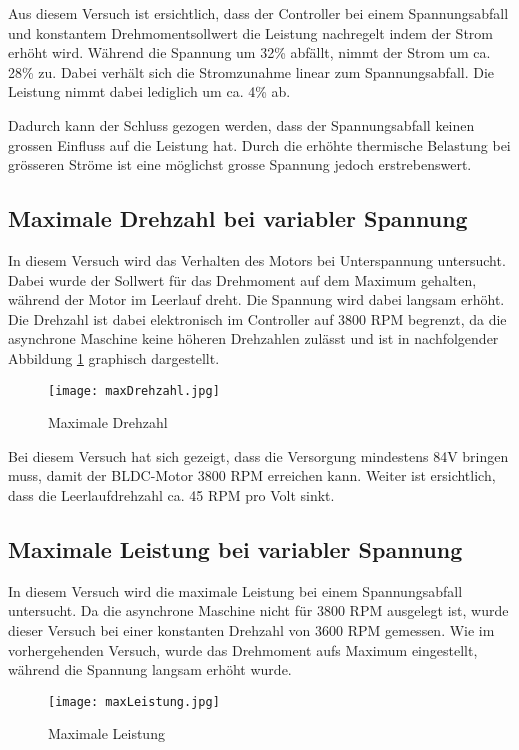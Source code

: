 Aus diesem Versuch ist ersichtlich, dass der Controller bei einem Spannungsabfall und konstantem Drehmomentsollwert die Leistung nachregelt indem der Strom erhöht wird. Während die Spannung um 32\% abfällt, nimmt der Strom um ca. 28\% zu. Dabei verhält sich die Stromzunahme linear zum Spannungsabfall. Die Leistung nimmt dabei lediglich um ca. 4\% ab.

Dadurch kann der Schluss gezogen werden, dass der Spannungsabfall keinen grossen Einfluss auf die Leistung hat. Durch die erhöhte thermische Belastung bei grösseren Ströme ist eine möglichst grosse Spannung jedoch erstrebenswert.

\subsection{Maximale Drehzahl bei variabler Spannung}\label{subsec:DrehzahlSpanungsabfall}
In diesem Versuch wird das Verhalten des Motors bei Unterspannung untersucht. Dabei wurde der Sollwert für das Drehmoment auf dem Maximum gehalten, während der Motor im Leerlauf dreht. Die Spannung wird dabei langsam erhöht. Die Drehzahl ist dabei elektronisch im Controller auf 3800 RPM begrenzt, da die asynchrone Maschine keine höheren Drehzahlen zulässt und ist in nachfolgender Abbildung \ref{fig:maxDrehzahl} graphisch dargestellt.

\begin{figure}[H]
	\centering
	\texttt{[image: maxDrehzahl.jpg]}
	\caption{Maximale Drehzahl}\label{fig:maxDrehzahl}
\end{figure}

Bei diesem Versuch hat sich gezeigt, dass die Versorgung mindestens 84V bringen muss, damit der BLDC-Motor 3800 RPM erreichen kann. Weiter ist ersichtlich, dass die Leerlaufdrehzahl ca. 45 RPM pro Volt sinkt.


\subsection{Maximale Leistung bei variabler Spannung}\label{subsec:LeistungSpannungsabfall}
In diesem Versuch wird die maximale Leistung bei einem Spannungsabfall untersucht. Da die asynchrone Maschine nicht für 3800 RPM ausgelegt ist, wurde dieser Versuch bei einer konstanten Drehzahl von 3600 RPM gemessen. Wie im vorhergehenden Versuch, wurde das Drehmoment aufs Maximum eingestellt, während die Spannung langsam erhöht wurde.


\begin{figure}[H]
	\centering
	\texttt{[image: maxLeistung.jpg]}
	\caption{Maximale Leistung}\label{fig:maxLeistung}
\end{figure}

